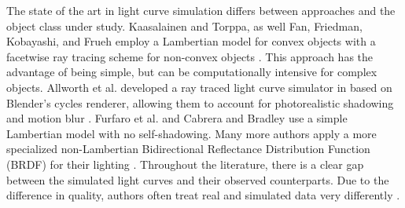 The state of the art in light curve simulation differs between approaches and the object class under study. Kaasalainen and Torppa, as well Fan, Friedman, Kobayashi, and Frueh employ a Lambertian model for convex objects with a facetwise ray tracing scheme for non-convex objects \cite{kaasalainen2001, fan2016, fan2020thesis,friedman2020,kobayashi2020,frueh2014}. This approach has the advantage of being simple, but can be computationally intensive for complex objects. Allworth et al. developed a ray traced light curve simulator in based on Blender's cycles renderer, allowing them to account for photorealistic shadowing and motion blur \cite{allworth2020, allworth2021}. Furfaro et al. \cite{furfaro2019} and Cabrera and Bradley \cite{cabrera2021,bradley2014} use a simple Lambertian model with no self-shadowing. Many more authors apply a more specialized non-Lambertian Bidirectional Reflectance Distribution Function (BRDF) for their lighting \cite{linares2018space, mcnally2021, blacketer2022}. Throughout the literature, there is a clear gap between the simulated light curves and their observed counterparts. Due to the difference in quality, authors often treat real and simulated data very differently \cite{allworth2021}.





